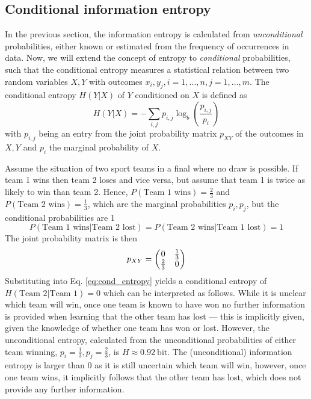 \subsection{Conditional information entropy}
\label{sec:cond_entropy}

In the previous section, the information entropy is calculated from \emph{unconditional} probabilities, either known or estimated
from the frequency of occurrences in data. Now, we will extend the concept of entropy to \emph{conditional} probabilities, such
that the conditional entropy measures a statistical relation between two random variables $X,Y$ with outcomes $x_i,y_j,
i = 1,...,n, j = 1,...,m$. The conditional entropy $H(Y\vert X)$ of $Y$ conditioned on $X$ is defined as
\begin{equation}
	H(Y \vert X) = - \sum_{i,j} p_{i,j} \log_b \left( \frac{p_{i,j}}{p_i} \right)
	\label{eq:cond_entropy}
\end{equation}
with $p_{i,j}$ being an entry from the joint probability matrix $p_{XY}$ of the outcomes in $X,Y$ and $p_i$ the marginal probability of $X$.

Assume the situation of two sport teams in a final where no draw is possible. If team 1 wins then team 2 loses and vice versa,
but assume that team 1 is twice as likely to win than team 2. Hence, $P(\text{Team 1 wins}) = \tfrac{2}{3}$ and $P(\text{Team 2 wins})
= \tfrac{1}{3}$, which are the marginal probabilities $p_i,p_j$, but the conditional probabilities are 1
\begin{equation}
P(\text{Team 1 wins}\vert \text{Team 2 lost}) = P(\text{Team 2 wins}\vert \text{Team 1 lost}) = 1
\end{equation}
The joint probability matrix is then
\begin{equation}
	p_{XY} = \begin{pmatrix} 0 & \tfrac{1}{3} \\
				\tfrac{2}{3} & 0 \end{pmatrix}
\end{equation}
Substituting into Eq. \ref{eq:cond_entropy} yields a conditional entropy of $H(\text{Team 2} \vert \text{Team 1}) = 0$ which can be
interpreted as follows. While it is unclear which team will win, once one team is known to have won no further information is 
provided when learning that the other team has lost --- this is implicitly given, given the knowledge of whether one team has won or lost.
However, the unconditional entropy, calculated from the unconditional probabilities of either team winning, $p_i = \tfrac{1}{3},
p_j = \tfrac{2}{3}$, is $H \approx 0.92~\mathrm{bit}$. The (unconditional) information entropy is larger than 0 as it is
still uncertain which team will win, however, once one team wins, it implicitly follows that the other team has lost, which does not
provide any further information. 

